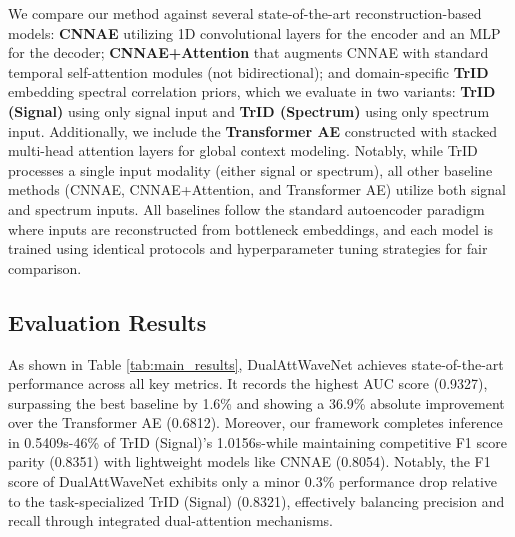 \documentclass[conference]{IEEEtran}
\begin{document}
We compare our method against several state-of-the-art reconstruction-based models: \textbf{CNNAE} utilizing 1D convolutional layers for the encoder and an MLP for the decoder; \textbf{CNNAE+Attention} that augments CNNAE with standard temporal self-attention modules (not bidirectional); and domain-specific \textbf{TrID} embedding spectral correlation priors, which we evaluate in two variants: \textbf{TrID (Signal)} using only signal input and \textbf{TrID (Spectrum)} using only spectrum input. Additionally, we include the \textbf{Transformer AE} constructed with stacked multi-head attention layers for global context modeling. Notably, while TrID processes a single input modality (either signal or spectrum), all other baseline methods (CNNAE, CNNAE+Attention, and Transformer AE) utilize both signal and spectrum inputs. All baselines follow the standard autoencoder paradigm where inputs are reconstructed from bottleneck embeddings, and each model is trained using identical protocols and hyperparameter tuning strategies for fair comparison.

\subsection{Evaluation Results}

As shown in Table \ref{tab:main_results}, DualAttWaveNet achieves state-of-the-art performance across all key metrics. It records the highest AUC score (0.9327), surpassing the best baseline by 1.6\% and showing a 36.9\% absolute improvement over the Transformer AE (0.6812). Moreover, our framework completes inference in 0.5409s-46\% of TrID (Signal)'s 1.0156s-while maintaining competitive F1 score parity (0.8351) with lightweight models like CNNAE (0.8054). Notably, the F1 score of DualAttWaveNet exhibits only a minor 0.3\% performance drop relative to the task-specialized TrID (Signal) (0.8321), effectively balancing precision and recall through integrated dual-attention mechanisms.
\end{document}
